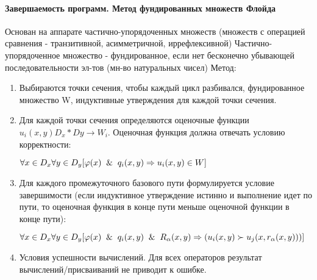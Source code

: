 \paragraph{Завершаемость программ. Метод фундированных множеств Флойда}
Основан на аппарате частично-упорядоченных множеств (множеств с операцией сравнения - транзитивной, асимметричной, иррефлексивной)
Частично-упорядоченное множество - фундированное, если нет бесконечно убывающей последовательности эл-тов (мн-во натуральных чисел)
Метод:
\begin{enumerate}
    \item Выбираются точки сечения, чтобы каждый цикл разбивался, фундированное множество W, индуктивные утверждения для каждой точки сечения.
    \item Для каждой точки сечения определяются оценочные функции $u_i(x, y) D_x * Dy \rightarrow W_i$. Оценочная функция должна отвечать условию корректности: 
    
    $\forall x  \in D_x \forall y \in D_y [\varphi(x) \And q_i(x, y) \Rightarrow u_i(x, y) \in W]$
    \item Для каждого промежуточного базового пути формулируется условие завершимости (если индуктивное утверждение истинно и выполнение идет по пути, то оценочная функция в конце пути меньше оценочной функции в конце пути):
    
    $\forall x  \in D_x \forall y \in D_y [\varphi(x) \And q_i(x, y) \And R_{\alpha}(x, y) \Rightarrow (u_i(x, y) \succ u_j(x, r_{\alpha}(x, y)))]$
    
    \item Условия успешности вычислений. Для всех операторов результат вычислений/присваиваний не приводит к ошибке.

\end{enumerate}


